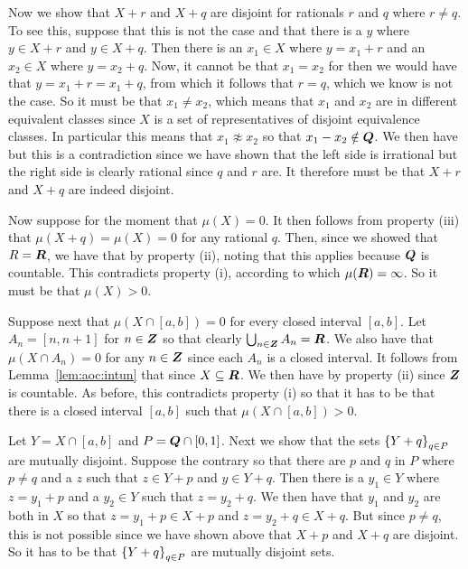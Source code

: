 \begin{questions}
{{    Now we show that $X + r$ and $X + q$ are disjoint for rationals $r$ and $q$ where $r \neq q$.
    To see this, suppose that this is not the case and that there is a $y$ where $y \in X + r$ and $y \in X + q$.
    Then there is an $x_1 \in X$ where $y = x_1 + r$ and an $x_2 \in X$ where $y = x_2 + q$.
    Now, it cannot be that $x_1 = x_2$ for then we would have that $y = x_1 + r = x_1 + q$, from which it follows that $r = q$, which we know is not the case.
    So it must be that $x_1 \neq x_2$, which means that $x_1$ and $x_2$ are in different equivalent classes since $X$ is a set of representatives of disjoint equivalence classes.
    In particular this means that $x_1 \not \approx x_2$ so that $x_1 - x_2 \notin {\boldsymbol{Q}}$.
    We then have
    but this is a contradiction since we have shown that the left side is irrational but the right side is clearly rational since $q$ and $r$ are.
    It therefore must be that $X + r$ and $X + q$ are indeed disjoint.

    Now suppose for the moment that $\mu(X) = 0$.
    It then follows from property (iii) that $\mu(X + q) = \mu(X) = 0$ for any rational $q$.
    Then, since we showed that $R = {\boldsymbol{R}}$, we have that
    by property (ii), noting that this applies because ${\boldsymbol{Q}}$ is countable.
    This contradicts property (i), according to which $\mu({\boldsymbol{R}}) = \infty$.
    So it must be that $\mu(X) > 0$.

    Suppose next that $\mu(X \cap [a, b]) = 0$ for every closed interval $[a,b]$.
    Let $A_n = [n, n+1]$ for $n \in {\boldsymbol{Z}}$ so that clearly $\bigcup_{n \in {\boldsymbol{Z}}} A_n = {\boldsymbol{R}}$.
    We also have that $\mu(X \cap A_n) = 0$ for any $n \in {\boldsymbol{Z}}$ since each $A_n$ is a closed interval.
    It follows from Lemma~\ref{lem:aoc:intun} that
    since $X \subseteq {\boldsymbol{R}}$.
    We then have
    by property (ii) since ${\boldsymbol{Z}}$ is countable.
    As before, this contradicts property (i) so that it has to be that there is a closed interval $[a,b]$ such that $\mu(X \cap [a,b]) > 0$.

    Let $Y = X \cap [a,b]$ and $P = {\boldsymbol{Q}} \cap [0,1]$.
    Next we show that the sets $\left\{ Y + q \right\}_{q \in P}$ are mutually disjoint.
    Suppose the contrary so that there are $p$ and $q$ in $P$ where $p \neq q$ and a $z$ such that $z \in Y + p$ and $y \in Y + q$.
    Then there is a $y_1 \in Y$ where $z = y_1 + p$ and a $y_2 \in Y$ such that $z = y_2 + q$.
    We then have that $y_1$ and $y_2$ are both in $X$ so that $z = y_1 + p \in X + p$ and $z = y_2 + q \in X + q$.
    But since $p \neq q$, this is not possible since we have shown above that $X + p$ and $X + q$ are disjoint.
    So it has to be that $\left\{ Y + q \right\}_{q \in P}$ are mutually disjoint sets.

}}
\end{questions}
